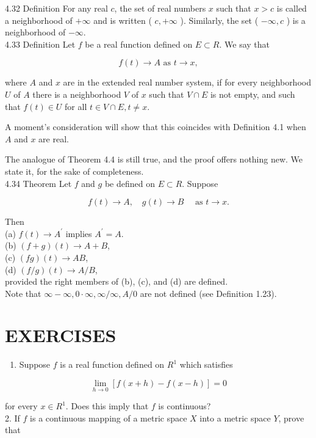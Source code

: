 \documentclass[10pt]{article}
\begin{document}
4.32 Definition For any real $c$, the set of real numbers $x$ such that $x>c$ is called a neighborhood of $+\infty$ and is written ( $c,+\infty$ ). Similarly, the set ( $-\infty, c$ ) is a neighborhood of $-\infty$.\\
4.33 Definition Let $f$ be a real function defined on $E \subset R$. We say that

$$
f(t) \rightarrow A \text { as } t \rightarrow x,
$$

where $A$ and $x$ are in the extended real number system, if for every neighborhood $U$ of $A$ there is a neighborhood $V$ of $x$ such that $V \cap E$ is not empty, and such that $f(t) \in U$ for all $t \in V \cap E, t \neq x$.

A moment's consideration will show that this coincides with Definition 4.1 when $A$ and $x$ are real.

The analogue of Theorem 4.4 is still true, and the proof offers nothing new. We state it, for the sake of completeness.\\
4.34 Theorem Let $f$ and $g$ be defined on $E \subset R$. Suppose

$$
f(t) \rightarrow A, \quad g(t) \rightarrow B \quad \text { as } t \rightarrow x .
$$

Then\\
(a) $f(t) \rightarrow A^{\prime}$ implies $A^{\prime}=A$.\\
(b) $(f+g)(t) \rightarrow A+B$,\\
(c) $(f g)(t) \rightarrow A B$,\\
(d) $(f / g)(t) \rightarrow A / B$,\\
provided the right members of (b), (c), and (d) are defined.\\
Note that $\infty-\infty, 0 \cdot \infty, \infty / \infty, A / 0$ are not defined (see Definition 1.23).

\section*{EXERCISES}
\begin{enumerate}
  \item Suppose $f$ is a real function defined on $R^{1}$ which satisfies
\end{enumerate}

$$
\lim _{h \rightarrow 0}[f(x+h)-f(x-h)]=0
$$

for every $x \in R^{1}$. Does this imply that $f$ is continuous?\\
2. If $f$ is a continuous mapping of a metric space $X$ into a metric space $Y$, prove that
\end{document}
